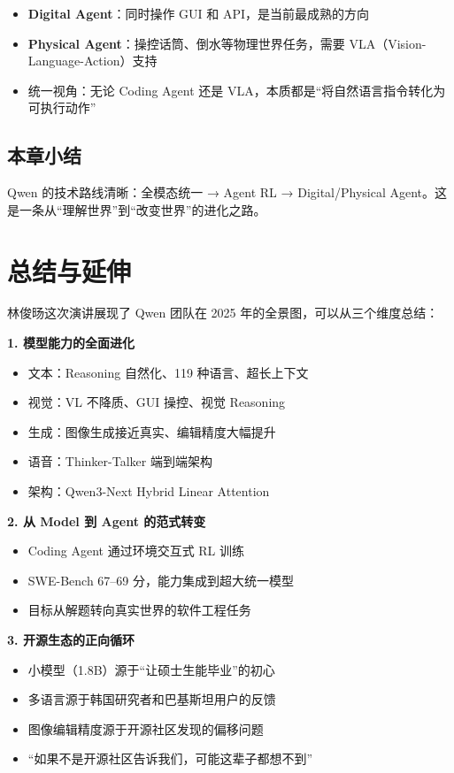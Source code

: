 \documentclass[a4paper]{article}
\begin{document}
\begin{itemize}
    \item \textbf{Digital Agent}：同时操作 GUI 和 API，是当前最成熟的方向
    \item \textbf{Physical Agent}：操控话筒、倒水等物理世界任务，需要 VLA（Vision-Language-Action）支持
    \item 统一视角：无论 Coding Agent 还是 VLA，本质都是``将自然语言指令转化为可执行动作''
\end{itemize}

\subsection{本章小结}

Qwen 的技术路线清晰：全模态统一 → Agent RL → Digital/Physical Agent。这是一条从``理解世界''到``改变世界''的进化之路。

\section{总结与延伸}

林俊旸这次演讲展现了 Qwen 团队在 2025 年的全景图，可以从三个维度总结：

\textbf{1. 模型能力的全面进化}
\begin{itemize}
    \item 文本：Reasoning 自然化、119 种语言、超长上下文
    \item 视觉：VL 不降质、GUI 操控、视觉 Reasoning
    \item 生成：图像生成接近真实、编辑精度大幅提升
    \item 语音：Thinker-Talker 端到端架构
    \item 架构：Qwen3-Next Hybrid Linear Attention
\end{itemize}

\textbf{2. 从 Model 到 Agent 的范式转变}
\begin{itemize}
    \item Coding Agent 通过环境交互式 RL 训练
    \item SWE-Bench 67--69 分，能力集成到超大统一模型
    \item 目标从解题转向真实世界的软件工程任务
\end{itemize}

\textbf{3. 开源生态的正向循环}
\begin{itemize}
    \item 小模型（1.8B）源于``让硕士生能毕业''的初心
    \item 多语言源于韩国研究者和巴基斯坦用户的反馈
    \item 图像编辑精度源于开源社区发现的偏移问题
    \item ``如果不是开源社区告诉我们，可能这辈子都想不到''
\end{itemize}
\end{document}
